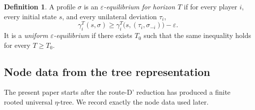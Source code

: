 \documentclass[12pt]{article}
\theoremstyle{definition}
\newtheorem{definition}[theorem]{Definition}
\newcommand{\eps}{\varepsilon}
\newcommand{\1}{\mathbf{1}}
\begin{document}
\begin{definition}
A profile $\sigma$ is an \emph{$\eps$-equilibrium for horizon $T$} if for every
player $i$, every initial state $s$, and every unilateral deviation $\tau_i$,
\[
\gamma_i^T(s,\sigma)
\ge
\gamma_i^T\bigl(s,(\tau_i,\sigma_{-i})\bigr)-\eps.
\]
It is a \emph{uniform $\eps$-equilibrium} if there exists $T_0$ such that the same
inequality holds for every $T\ge T_0$.
\end{definition}

\subsection{Node data from the tree representation}

The present paper starts after the route-D' reduction has produced a finite rooted
universal $\eta$-tree. We record exactly the node data used later.
\end{document}
